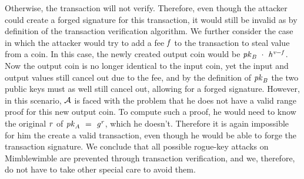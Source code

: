 Otherwise, the transaction will not verify.
Therefore, even though the attacker could create a forged signature for this transaction, it would still be invalid as by definition of the transaction verification algorithm.
We further consider the case in which the attacker would try to add a fee $\mathit{f}$ to the transaction to steal value from a coin.
In this case, the newly created output coin would be $\mathit{pk}_{\mathit{B}} ~\cdot~ \mathit{h}^{\mathit{v} - \mathit{f}}$.
Now the output coin is no longer identical to the input coin, yet the input and output values still cancel out due to the fee, and by the definition of $\mathit{pk}_{\mathit{B}}$ the two public keys must as well still cancel out, allowing for a forged signature.
However, in this scenario, $\mathcal{A}$ is faced with the problem that he does not have a valid range proof for this new output coin.
To compute such a proof, he would need to know the original $\mathit{r}$ of $\mathit{pk}_{\mathit{A}} ~=~ \mathit{g}^{\mathit{r}}$, which he doesn't.
Therefore it is again impossible for him the create a valid transaction, even though he would be able to forge the transaction signature.
We conclude that all possible rogue-key attacks on Mimblewimble are prevented through transaction verification, and we, therefore, do not have to take other special care to avoid them.



